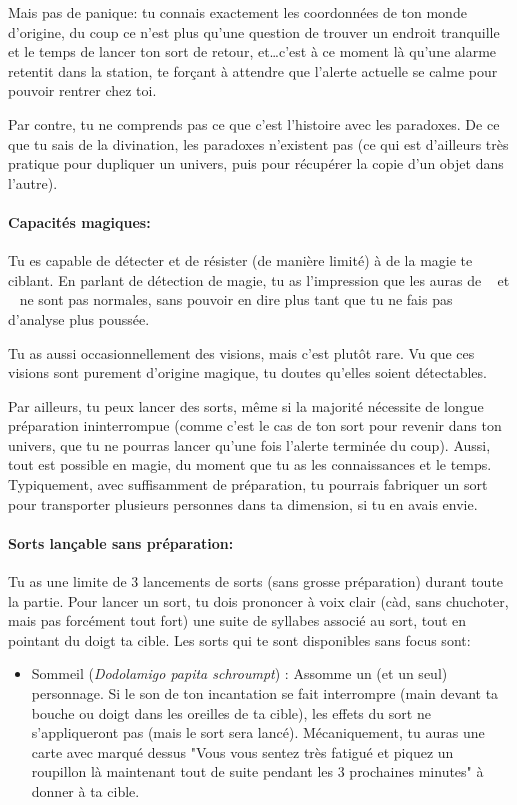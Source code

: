 {	\par Mais pas de panique: tu connais exactement les coordonnées de ton monde d'origine, du coup ce n'est plus qu'une question de trouver un endroit tranquille et le temps de lancer ton sort de retour, et\dots c'est à ce moment là qu'une alarme retentit dans la station, te forçant à attendre que l'alerte actuelle se calme pour pouvoir rentrer chez toi.
	
	\par Par contre, tu ne comprends pas ce que c'est l'histoire avec les paradoxes. De ce que tu sais de la divination, les paradoxes n'existent pas (ce qui est d'ailleurs très pratique pour dupliquer un univers, puis pour récupérer la copie d'un objet dans l'autre).
	
	
	\paragraph{Capacités magiques:} Tu es capable de détecter et de résister (de manière limité) à de la magie te ciblant. En parlant de détection de magie, tu as l'impression que les auras de \nmPlayerXI ~ et \nmPlayerIX ~ ne sont pas normales, sans pouvoir en dire plus tant que tu ne fais pas d'analyse plus poussée.
	
	\par Tu as aussi occasionnellement des visions, mais c'est plutôt rare. Vu que ces visions sont purement d'origine magique, tu doutes qu'elles soient détectables.
	
	\par Par ailleurs, tu peux lancer des sorts, même si la majorité nécessite de longue préparation ininterrompue (comme c'est le cas de ton sort pour revenir dans ton univers, que tu ne pourras lancer qu'une fois l'alerte terminée du coup). Aussi, tout est possible en magie, du moment que tu as les connaissances et le temps. Typiquement, avec suffisamment de préparation, tu pourrais fabriquer un sort pour transporter plusieurs personnes dans ta dimension, si tu en avais envie.
	
	\paragraph{Sorts lançable sans préparation:} Tu as une limite de 3 lancements de sorts (sans grosse préparation) durant toute la partie. Pour lancer un sort, tu dois prononcer à voix clair (càd, sans chuchoter, mais pas forcément tout fort) une suite de syllabes associé au sort, tout en pointant du doigt ta cible. Les sorts qui te sont disponibles sans focus sont:
	\begin{itemize}
		\item Sommeil (\emph{Dodolamigo papita schroumpt}) : Assomme un (et un seul) personnage. Si le son de ton incantation se fait interrompre (main devant ta bouche ou doigt dans les oreilles de ta cible), les effets du sort ne s'appliqueront pas (mais le sort sera lancé). Mécaniquement, tu auras une carte avec marqué dessus "Vous vous sentez très fatigué et piquez un roupillon là maintenant tout de suite pendant les 3 prochaines minutes" à donner à ta cible.
		

\end{itemize}}

